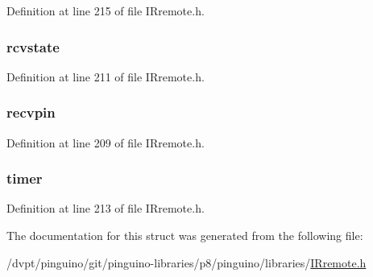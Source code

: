 Definition at line 215 of file I\-Rremote.\-h.

\hypertarget{structirparams__t_ad19b6aa0f045f1d4ae8e8d91427b43fb}{
\subsubsection[{rcvstate}]{ rcvstate}}\label{structirparams__t_ad19b6aa0f045f1d4ae8e8d91427b43fb}


Definition at line 211 of file I\-Rremote.\-h.

\hypertarget{structirparams__t_a4831b4b2b741b9a1c9e40a3cb4384b4b}{
\subsubsection[{recvpin}]{ recvpin}}\label{structirparams__t_a4831b4b2b741b9a1c9e40a3cb4384b4b}


Definition at line 209 of file I\-Rremote.\-h.

\hypertarget{structirparams__t_a4dd98e3cba82c3c6cfa930335b55a567}{
\subsubsection[{timer}]{ timer}}\label{structirparams__t_a4dd98e3cba82c3c6cfa930335b55a567}


Definition at line 213 of file I\-Rremote.\-h.



The documentation for this struct was generated from the following file\-:\begin{DoxyCompactItemize}
\item 
/dvpt/pinguino/git/pinguino-\/libraries/p8/pinguino/libraries/\hyperlink{_i_rremote_8h}{I\-Rremote.\-h}\end{DoxyCompactItemize}
